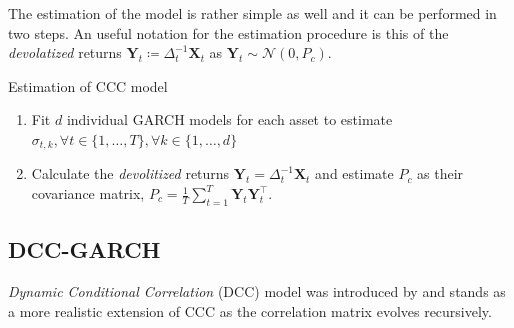 \documentclass[a4paper, oneside]{discothesis}
\begin{document}
The estimation of the model is rather simple as well and it can be performed in two steps. An useful notation for the estimation procedure is this of the \textit{devolatized} returns $\mathbf{Y}_t \coloneqq \Delta_t^{-1}\mathbf{X}_t$ as $\mathbf{Y}_t\sim \mathcal{N}(0, P_c)$.

\begin{algorithm}
\caption{Estimation of CCC model}
\begin{algorithmic}
\State \begin{enumerate}
    \item Fit $d$ individual GARCH models for each asset to estimate $\sigma_{t, k}, \forall t\in \{1, \dots, T\},\forall k\in\{1, \dots, d\}$
    \item Calculate the \textit{devolitized} returns $\mathbf{Y}_t = \Delta_t^{-1}\mathbf{X}_t$ and estimate $P_c$ as their covariance matrix, $P_c = \frac{1}{T}\sum_{t=1}^T \mathbf{Y}_t\mathbf{Y}_t^\intercal$.
\end{enumerate}
\end{algorithmic}
\end{algorithm}

\subsection{DCC-GARCH}
\textit{Dynamic Conditional Correlation} (DCC) model was introduced by \cite{DCC} and stands as a more realistic extension of CCC as the correlation matrix evolves recursively. 
\end{document}
